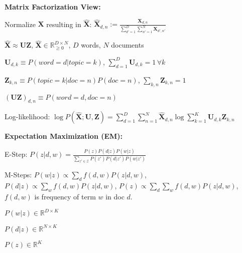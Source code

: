 \documentclass[a4paper, 11pt, landscape]{article}
\begin{document}
\begin{multicols*}{3}
\textbf{Matrix Factorization View:}
\begin{inparaitem}[\color{red}\textbullet]
	\item Normalize $\mathbf{X}$ resulting in $\hat{\mathbf{X}}$: $\hat{\mathbf{X}}_{d, n} := \frac{\mathbf{X}_{d,n}}{\sum_{d'=1}^D \sum_{n'=1}^N \mathbf{X}_{d', n'}}$
	\item $\hat{\mathbf{X}} \approx \mathbf{U} \mathbf{Z}$, $\hat{\mathbf{X}} \in \mathbb{R}^{D \times N}_{\geq 0}$, $D$ words, $N$ documents
	\item $\mathbf{U}_{d, k} \equiv P(\mathit{word}=d | \mathit{topic} = k)$, $\sum_{d=1}^D \mathbf{U}_{d,k} = 1\, \forall k$
	\item $\mathbf{Z}_{k,n} \equiv P(\mathit{topic} = k | \mathit{doc} = n) P(\mathit{doc} = n)$, $\sum_{k, n} \mathbf{Z}_{k,n} = 1$
	\item $(\mathbf{U}\mathbf{Z})_{d, n} \equiv P(\mathit{word = d}, \mathit{doc} = n)$
	\item Log-likelihood: $\log P(\hat{\mathbf{X}}; \mathbf{U}, \mathbf{Z}) = \sum_{d=1}^D \sum_{n=1}^N \hat{\mathbf{X}}_{d,n} \log \sum_{k=1}^K \mathbf{U}_{d, k} \mathbf{Z}_{k, n}$
\end{inparaitem}

\textbf{Expectation Maximization (EM):}
\begin{compactenum}
	\item E-Step: $P(z|d, w) = \frac{P(z)P(d|z)P(w|z)}{\sum_{z' \in \mathcal{Z}} P(z') P(d|z') P(w|z')}$
	\item M-Steps: $P(w|z) \propto \sum_{d} f(d, w) P(z|d, w)$, $P(d|z) \propto \sum_{w} f(d, w) P(z|d, w)$, $P(z) \propto \sum_{d} \sum_{w} f(d, w) P(z|d, w)$, $f(d, w)$ is frequency of term $w$ in doc $d$.
\end{compactenum}
\begin{inparaitem}[\color{red}\textbullet]
	\item $P(w|z) \in \mathbb{R}^{D \times K}$
	\item $P(d|z) \in \mathbb{R}^{N \times K}$
	\item $P(z) \in \mathbb{R}^{K}$
\end{inparaitem}


\end{multicols*}
\end{document}
